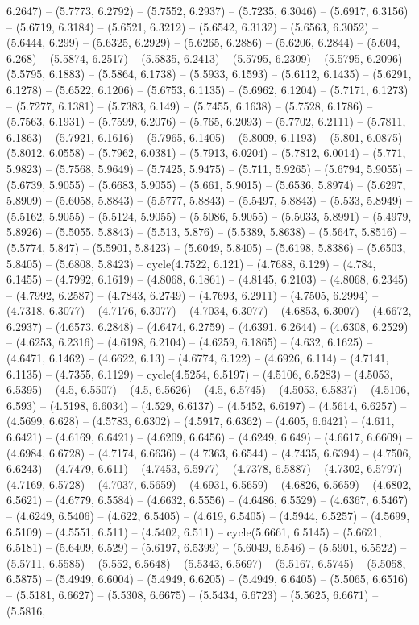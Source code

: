 6.2647) -- (5.7773, 6.2792) -- (5.7552, 6.2937) -- (5.7235, 6.3046) -- (5.6917, 6.3156) -- (5.6719, 6.3184) -- (5.6521, 6.3212) -- (5.6542, 6.3132) -- (5.6563, 6.3052) -- (5.6444, 6.299) -- (5.6325, 6.2929) -- (5.6265, 6.2886) -- (5.6206, 6.2844) -- (5.604, 6.268) -- (5.5874, 6.2517) -- (5.5835, 6.2413) -- (5.5795, 6.2309) -- (5.5795, 6.2096) -- (5.5795, 6.1883) -- (5.5864, 6.1738) -- (5.5933, 6.1593) -- (5.6112, 6.1435) -- (5.6291, 6.1278) -- (5.6522, 6.1206) -- (5.6753, 6.1135) -- (5.6962, 6.1204) -- (5.7171, 6.1273) -- (5.7277, 6.1381) -- (5.7383, 6.149) -- (5.7455, 6.1638) -- (5.7528, 6.1786) -- (5.7563, 6.1931) -- (5.7599, 6.2076) -- (5.765, 6.2093) -- (5.7702, 6.2111) -- (5.7811, 6.1863) -- (5.7921, 6.1616) -- (5.7965, 6.1405) -- (5.8009, 6.1193) -- (5.801, 6.0875) -- (5.8012, 6.0558) -- (5.7962, 6.0381) -- (5.7913, 6.0204) -- (5.7812, 6.0014) -- (5.771, 5.9823) -- (5.7568, 5.9649) -- (5.7425, 5.9475) -- (5.711, 5.9265) -- (5.6794, 5.9055) -- (5.6739, 5.9055) -- (5.6683, 5.9055) -- (5.661, 5.9015) -- (5.6536, 5.8974) -- (5.6297, 5.8909) -- (5.6058, 5.8843) -- (5.5777, 5.8843) -- (5.5497, 5.8843) -- (5.533, 5.8949) -- (5.5162, 5.9055) -- (5.5124, 5.9055) -- (5.5086, 5.9055) -- (5.5033, 5.8991) -- (5.4979, 5.8926) -- (5.5055, 5.8843) -- (5.513, 5.876) -- (5.5389, 5.8638) -- (5.5647, 5.8516) -- (5.5774, 5.847) -- (5.5901, 5.8423) -- (5.6049, 5.8405) -- (5.6198, 5.8386) -- (5.6503, 5.8405) -- (5.6808, 5.8423) -- cycle(4.7522, 6.121) -- (4.7688, 6.129) -- (4.784, 6.1455) -- (4.7992, 6.1619) -- (4.8068, 6.1861) -- (4.8145, 6.2103) -- (4.8068, 6.2345) -- (4.7992, 6.2587) -- (4.7843, 6.2749) -- (4.7693, 6.2911) -- (4.7505, 6.2994) -- (4.7318, 6.3077) -- (4.7176, 6.3077) -- (4.7034, 6.3077) -- (4.6853, 6.3007) -- (4.6672, 6.2937) -- (4.6573, 6.2848) -- (4.6474, 6.2759) -- (4.6391, 6.2644) -- (4.6308, 6.2529) -- (4.6253, 6.2316) -- (4.6198, 6.2104) -- (4.6259, 6.1865) -- (4.632, 6.1625) -- (4.6471, 6.1462) -- (4.6622, 6.13) -- (4.6774, 6.122) -- (4.6926, 6.114) -- (4.7141, 6.1135) -- (4.7355, 6.1129) -- cycle(4.5254, 6.5197) -- (4.5106, 6.5283) -- (4.5053, 6.5395) -- (4.5, 6.5507) -- (4.5, 6.5626) -- (4.5, 6.5745) -- (4.5053, 6.5837) -- (4.5106, 6.593) -- (4.5198, 6.6034) -- (4.529, 6.6137) -- (4.5452, 6.6197) -- (4.5614, 6.6257) -- (4.5699, 6.628) -- (4.5783, 6.6302) -- (4.5917, 6.6362) -- (4.605, 6.6421) -- (4.611, 6.6421) -- (4.6169, 6.6421) -- (4.6209, 6.6456) -- (4.6249, 6.649) -- (4.6617, 6.6609) -- (4.6984, 6.6728) -- (4.7174, 6.6636) -- (4.7363, 6.6544) -- (4.7435, 6.6394) -- (4.7506, 6.6243) -- (4.7479, 6.611) -- (4.7453, 6.5977) -- (4.7378, 6.5887) -- (4.7302, 6.5797) -- (4.7169, 6.5728) -- (4.7037, 6.5659) -- (4.6931, 6.5659) -- (4.6826, 6.5659) -- (4.6802, 6.5621) -- (4.6779, 6.5584) -- (4.6632, 6.5556) -- (4.6486, 6.5529) -- (4.6367, 6.5467) -- (4.6249, 6.5406) -- (4.622, 6.5405) -- (4.619, 6.5405) -- (4.5944, 6.5257) -- (4.5699, 6.5109) -- (4.5551, 6.511) -- (4.5402, 6.511) -- cycle(5.6661, 6.5145) -- (5.6621, 6.5181) -- (5.6409, 6.529) -- (5.6197, 6.5399) -- (5.6049, 6.546) -- (5.5901, 6.5522) -- (5.5711, 6.5585) -- (5.552, 6.5648) -- (5.5343, 6.5697) -- (5.5167, 6.5745) -- (5.5058, 6.5875) -- (5.4949, 6.6004) -- (5.4949, 6.6205) -- (5.4949, 6.6405) -- (5.5065, 6.6516) -- (5.5181, 6.6627) -- (5.5308, 6.6675) -- (5.5434, 6.6723) -- (5.5625, 6.6671) -- (5.5816, 